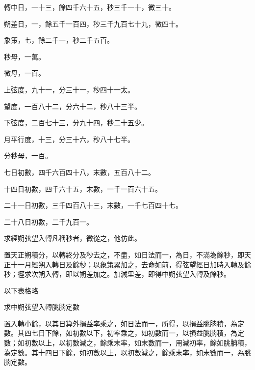 \begin{pinyinscope}
 轉中日，一十三，餘四千六十五，秒三千一十，微三十。



 朔差日，一，餘五千一百四，秒三千九百七十九，微四十。



 象策，七，餘二千一，秒二千五百。



 秒母，一萬。



 微母，一百。



 上弦度，九十一，分三十一，秒四十一太。



 望度，一百八十二，分六十二，秒八十三半。



 下弦度，二百七十三，分九十四，秒二十五少。



 月平行度，十三，分三十六，秒八十七半。



 分秒母，一百。



 七日初數，四千六百四十八，末數，五百八十二。



 十四日初數，四千六十五，末數，一千一百六十五。



 二十一日初數，三千四百八十三，末數，一千七百四十七。



 二十八日初數，二千九百一。



 求經朔弦望入轉凡稱秒者，微從之，他仿此。



 置天正朔積分，以轉終分及秒去之，不盡，如日法而一，為日，不滿為餘秒，即天正十一月經朔入轉日及餘秒；以象策累加之，去命如前，得弦望經日加時入轉及餘秒；徑求次朔入轉，即以朔差加之。加減里差，即得中朔弦望入轉及餘秒。



 以下表格略



 求中朔弦望入轉朓朒定數



 置入轉小餘，以其日算外損益率乘之，如日法而一，所得，以損益朓朒積，為定數。其四七日下餘，如初數以下，初率乘之，如初數而一，以損益朓朒積，為定數；如初數以上，以初數減之，餘乘末率，如末數而一，用減初率，餘如朓朒積，為定數。其十四日下餘，如初數以上，以初數減之，餘乘末率，如末數而一，為朓朒定數。




\end{pinyinscope}
